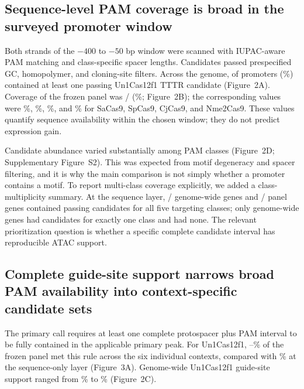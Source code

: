 \documentclass[11pt]{article}
\begin{document}
\subsection{Sequence-level PAM coverage is broad in the surveyed promoter window}

Both strands of the $-400$ to $-50$ bp window were scanned with IUPAC-aware PAM matching and class-specific spacer lengths. Candidates passed prespecified GC, homopolymer, and cloning-site filters. Across the genome, \UnGenomePamN{} of \NGeneFormatted{} promoters (\UnGenomePamPct\%) contained at least one passing Un1Cas12f1 TTTR candidate (Figure~2A). Coverage of the frozen panel was \UnPanelPamN/\NPanel{} (\UnPanelPamPct\%; Figure~2B); the corresponding values were \SaPanelPamPct\%, \SpPanelPamPct\%, \CjPanelPamPct\%, and \NmePanelPamPct\% for SaCas9, SpCas9, CjCas9, and Nme2Cas9. These values quantify sequence availability within the chosen window; they do not predict expression gain.

Candidate abundance varied substantially among PAM classes (Figure~2D; Supplementary Figure~S2). This was expected from motif degeneracy and spacer filtering, and it is why the main comparison is not simply whether a promoter contains a motif. To report multi-class coverage explicitly, we added a class-multiplicity summary. At the sequence layer, \MultiGenomeSeqAllFiveN/\NGeneFormatted{} genome-wide genes and \MultiPanelSeqAllFiveN/\NPanel{} panel genes contained passing candidates for all five targeting classes; only \MultiGenomeSeqOneN{} genome-wide genes had candidates for exactly one class and \MultiGenomeSeqNoneN{} had none. The relevant prioritization question is whether a specific complete candidate interval has reproducible ATAC support.

\subsection{Complete guide-site support narrows broad PAM availability into context-specific candidate sets}

The primary call requires at least one complete protospacer plus PAM interval to be fully contained in the applicable primary peak. For Un1Cas12f1, \UnPanelTargetMinPct--\UnPanelTargetMaxPct\% of the frozen panel met this rule across the six individual contexts, compared with \UnPanelPamPct\% at the sequence-only layer (Figure~3A). Genome-wide Un1Cas12f1 guide-site support ranged from \UnGenomeTargetMinPct\% to \UnGenomeTargetMaxPct\% (Figure~2C).
\end{document}
